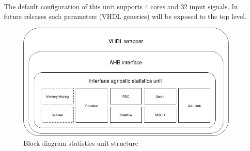 The default configuration of this unit supports 4 cores and 32 input signals. In future releases such parameters (VHDL generics) will be exposed to the top level.
\begin{figure}[H]
	\includegraphics[keepaspectratio,width=\columnwidth]{img/GRLIB_SU.png}
	\caption{Block diagram statistics unit structure}
	\label{fig:blkdia}
\end{figure}
